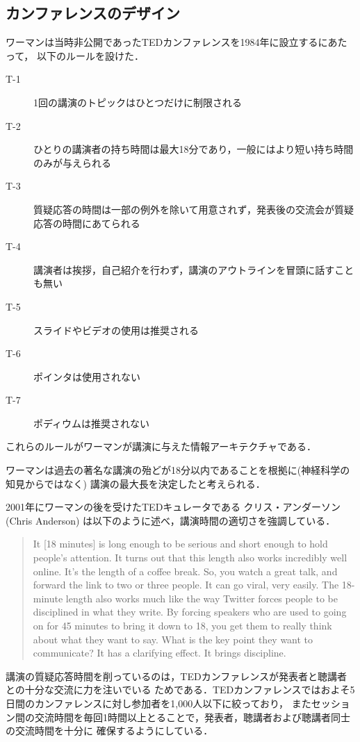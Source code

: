 \documentclass[submit,techreq,jkeyword,noauthor]{ipsj}
\newcommand{\TED}{\textrm{TED}}
\begin{document}
\subsection{カンファレンスのデザイン}

ワーマンは当時非公開であった\TED カンファレンスを1984年に設立するにあたって，
以下のルールを設けた．
\begin{description}
\item[T-1] 1回の講演のトピックはひとつだけに制限される
\item[T-2] ひとりの講演者の持ち時間は最大18分であり，一般にはより短い持ち時間のみが与えられる
\item[T-3] 質疑応答の時間は一部の例外を除いて用意されず，発表後の交流会が質疑応答の時間にあてられる
\item[T-4] 講演者は挨拶，自己紹介を行わず，講演のアウトラインを冒頭に話すことも無い
\item[T-5] スライドやビデオの使用は推奨される
\item[T-6] ポインタは使用されない
\item[T-7] ポディウムは推奨されない
\end{description}
これらのルールがワーマンが講演に与えた情報アーキテクチャである．

ワーマンは過去の著名な講演の殆どが18分以内であることを根拠に(神経科学の知見からではなく)
講演の最大長を決定したと考えられる．\cite{cg}

2001年にワーマンの後を受けた\TED キュレータである
クリス・アンダーソン (Chris Anderson) は以下のように述べ，講演時間の適切さを強調している．\cite{cgweb}
\begin{quote}
It [18 minutes] is long enough to be serious and short enough to hold people's attention.
It turns out that this length also works incredibly well online. It's the length of a 
coffee break. So, you watch a great talk, and forward the link to two or three people. 
It can go viral, very easily. The 18-minute length also works much like the way Twitter 
forces people to be disciplined in what they write. By forcing speakers who are used to 
going on for 45 minutes to bring it down to 18, you get them to really think about what 
they want to say. What is the key point they want to communicate? It has a clarifying 
effect. It brings discipline.
\end{quote}

講演の質疑応答時間を削っているのは，\TED カンファレンスが発表者と聴講者との十分な交流に力を注いでいる
ためである．\TED カンファレンスではおよそ5日間のカンファレンスに対し参加者を1,000人以下に絞っており，
またセッション間の交流時間を毎回1時間以上とることで，発表者，聴講者および聴講者同士の交流時間を十分に
確保するようにしている．
\end{document}
